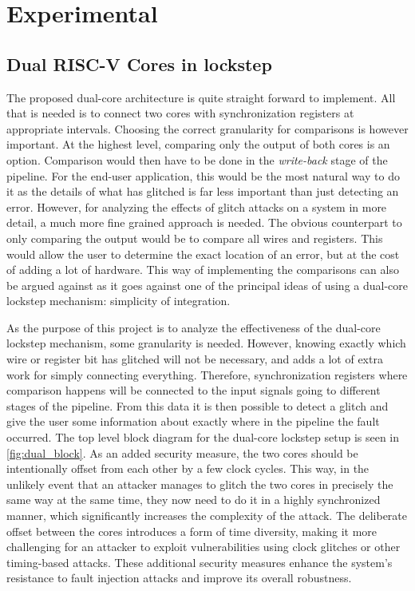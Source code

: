 \chapter{Experimental}
\label{chap4}

\section{Dual RISC-V Cores in lockstep}
\label{sec:dualcore}

The proposed dual-core architecture is quite straight forward to implement. All that is needed is to connect two cores with synchronization registers at appropriate intervals. Choosing the correct granularity for comparisons is however important. At the highest level, comparing only the output of both cores is an option. Comparison would then have to be done in the \textit{write-back} stage of the pipeline. For the end-user application, this would be the most natural way to do it as the details of what has glitched is far less important than just detecting an error. However, for analyzing the effects of glitch attacks on a system in more detail, a much more fine grained approach is needed. The obvious counterpart to only comparing the output would be to compare all wires and registers. This would allow the user to determine the exact location of an error, but at the cost of adding a lot of hardware. This way of implementing the comparisons can also be argued against as it goes against one of the principal ideas of using a dual-core lockstep mechanism: simplicity of integration. 

As the purpose of this project is to analyze the effectiveness of the dual-core lockstep mechanism, some granularity is needed. However, knowing exactly which wire or register bit has glitched will not be necessary, and adds a lot of extra work for simply connecting everything. Therefore, synchronization registers where comparison happens will be connected to the input signals going to different stages of the pipeline. From this data it is then possible to detect a glitch and give the user some information about exactly where in the pipeline the fault occurred. The top level block diagram for the dual-core lockstep setup is seen in \autoref{fig:dual_block}. As an added security measure, the two cores should be intentionally offset from each other by a few clock cycles. This way, in the unlikely event that an attacker manages to glitch the two cores in precisely the same way at the same time, they now need to do it in a highly synchronized manner, which significantly increases the complexity of the attack. The deliberate offset between the cores introduces a form of time diversity, making it more challenging for an attacker to exploit vulnerabilities using clock glitches or other timing-based attacks. These additional security measures enhance the system's resistance to fault injection attacks and improve its overall robustness.

